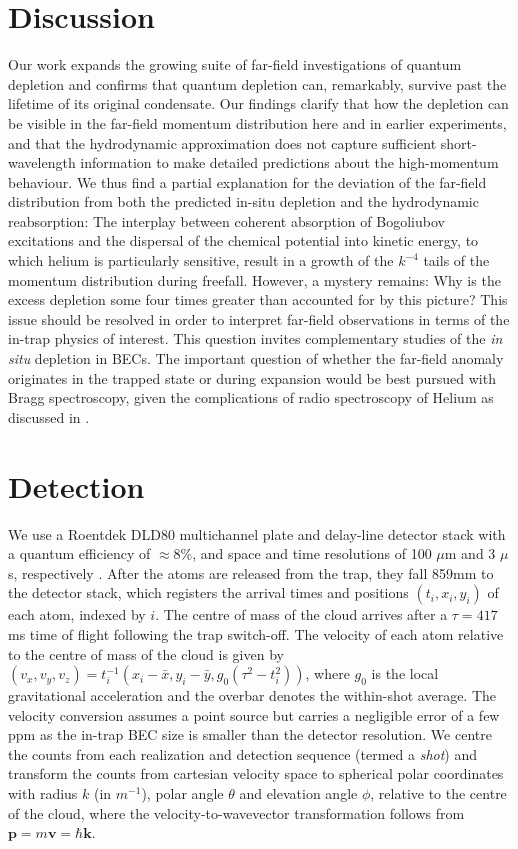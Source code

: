 	\section{Discussion} 
	Our work expands the growing suite of far-field investigations of quantum depletion \cite{cayla20,chang16} and confirms that quantum depletion can, remarkably, survive past the lifetime of its original condensate. Our findings clarify that how the depletion can be visible in the far-field momentum distribution here and in earlier experiments, and that the hydrodynamic approximation does not capture sufficient short-wavelength information to make detailed predictions about the high-momentum behaviour. We thus find a partial explanation for the deviation of the far-field distribution from both the predicted in-situ depletion and the hydrodynamic reabsorption: The interplay between coherent absorption of Bogoliubov excitations and the dispersal of the chemical potential into kinetic energy, to which helium is particularly sensitive, result in a growth of the $k^{-4}$ tails of the momentum distribution during freefall. However, a mystery remains: Why is the excess depletion some four times greater than accounted for by this picture? This issue should be resolved in order to interpret far-field observations in terms of the in-trap physics of interest. This question invites complementary studies of the \emph{in situ} depletion in \mhe BECs. The important question of whether the far-field anomaly originates in the trapped state or during expansion would be best pursued with Bragg spectroscopy, given the complications of radio spectroscopy of Helium as discussed in \cite{SOM}.


\section{Detection}

	We use a Roentdek DLD80 multichannel plate and delay-line detector stack \cite{Manning10} with a quantum efficiency of $\approx8\%$, and space and time resolutions of 100 $\mu$m and 3 $\mu$s, respectively \cite{Henson18}. After the atoms are released from the trap, they fall 859mm to the detector stack, which registers the arrival times and positions $(t_i,x_i,y_i)$ of each atom, indexed by $i$. The centre of mass of the cloud arrives after a $\tau = 417$ms time of flight following the trap switch-off. The velocity of each atom relative to the centre of mass of the cloud is given by $(v_x,v_y,v_z) = t_{i}^{-1}(x_i-\bar{x},y_i-\bar{y},g_0(\tau^2-t_{i}^{2}))$, where $g_0$ is the local gravitational acceleration and the overbar denotes the within-shot average. The velocity conversion assumes a point source but carries a negligible error of a few ppm as the in-trap BEC size is smaller than the detector resolution. We centre the counts from each realization and detection sequence (termed a \emph{shot}) and transform the counts from cartesian velocity space to spherical polar coordinates with radius $k$ (in $m^{-1}$), polar angle $\theta$ and elevation angle $\phi$, relative to the centre of the cloud, where the velocity-to-wavevector transformation follows from  $\textbf{p}=m\textbf{v}=\hbar\textbf{k}$. 



